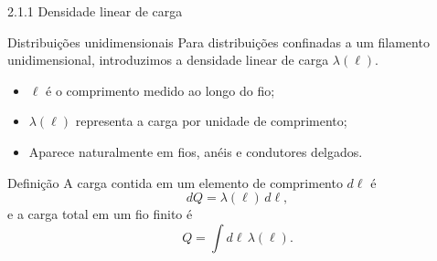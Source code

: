 \documentclass[aspectratio=169]{beamer}
\newcommand{\blue}[1]{\textcolor{myblue}{#1}}
\begin{document}
\begin{frame}{2.1.1 Densidade linear de carga}
\begin{block}{Distribuições unidimensionais}
Para distribuições confinadas a um \blue{filamento unidimensional},
introduzimos a densidade linear de carga $\lambda(\ell)$.
\end{block}

\begin{itemize}
  \item $\ell$ é o comprimento medido ao longo do fio;
  \item $\lambda(\ell)$ representa a carga por unidade de comprimento;
  \item Aparece naturalmente em fios, anéis e condutores delgados.
\end{itemize}

\begin{block}{Definição}
A carga contida em um elemento de comprimento $d\ell$ é
\begin{equation}
dQ = \lambda(\ell)\, d\ell,
\label{eq:dQ_linear}
\end{equation}
e a carga total em um fio finito é
\begin{equation}
Q = \int d\ell\, \lambda(\ell).
\tag{2.6}
\label{eq:Q_linear}
\end{equation}
\end{block}
\end{frame}
\end{document}
